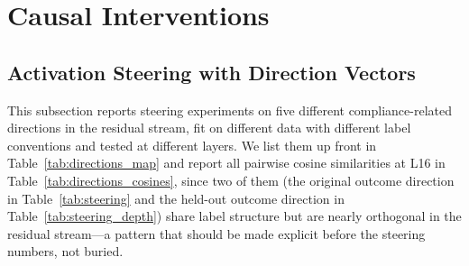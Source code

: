 \documentclass[11pt]{article}
\begin{document}
\section{Causal Interventions}
\label{sec:causal}

\subsection{Activation Steering with Direction Vectors}

This subsection reports steering experiments on five different compliance-related directions in the residual stream, fit on different data with different label conventions and tested at different layers.
We list them up front in Table~\ref{tab:directions_map} and report all pairwise cosine similarities at L16 in Table~\ref{tab:directions_cosines}, since two of them (the original outcome direction in Table~\ref{tab:steering} and the held-out outcome direction in Table~\ref{tab:steering_depth}) share label structure but are nearly orthogonal in the residual stream---a pattern that should be made explicit before the steering numbers, not buried.
\end{document}
